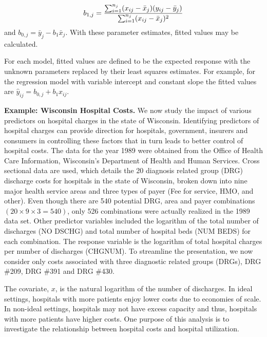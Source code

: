 \begin{equation*}
b_{1,j}=\frac{\sum_{i=1}^{n_j}(x_{ij}-\bar{x}_j)(y_{ij}-\bar{y}_j)}{%
\sum_{i=1}^{n_j}(x_{ij}-\bar{x}_j)^2}
\end{equation*}
and $b_{0,j}=\bar{y}_j-b_1\bar{x}_j$. With these parameter
estimates, fitted values may be calculated.

For each model, fitted values are defined to be the expected response with
the unknown parameters replaced by their least squares estimates.
For example, for the regression model with variable intercept and
constant slope the fitted values are
$\hat{y}_{ij}=b_{0,j}+b_1x_{ij}$.

\linejed


 

\textbf{Example: Wisconsin Hospital Costs.} We now study the impact of various predictors on hospital
charges in the state of Wisconsin. Identifying predictors of
hospital charges can provide direction for hospitals, government,
insurers and consumers in controlling these factors that in turn
leads to better control of hospital costs. The data for the year
1989 were obtained from the Office of Health Care Information,
Wisconsin's Department of Health and Human Services. Cross sectional
data are used, which details the 20 diagnosis related group (DRG)
discharge costs for hospitals in the state of Wisconsin, broken down
into nine major health service areas and three types of payer (Fee
for service, HMO, and other). Even though there are 540 potential
DRG, area and payer combinations $(20\times 9\times 3=540)$, only
526 combinations were actually realized in the 1989 data set. Other
predictor variables included the logarithm of the total number of
discharges (NO DSCHG) and total number of hospital beds (NUM BEDS)
for each combination. The response variable is the logarithm of
total hospital charges per number of discharges (CHGNUM). To
streamline the presentation, we now consider only costs associated
with three diagnostic related groups (DRGs), DRG \#209, DRG \#391
and DRG \#430.

The covariate, $x$, is the natural logarithm of the number of
discharges. In ideal settings, hospitals with more patients enjoy
lower costs due to economies of scale. In non-ideal settings,
hospitals may not have excess capacity and thus, hospitals with more
patients have higher costs. One purpose of this analysis is to
investigate the relationship between hospital costs and hospital
utilization.

